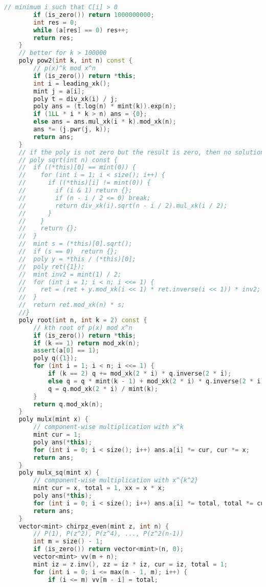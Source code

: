 \documentclass[10pt, a4paper, oneside]{book}
\begin{document}
\begin{lstlisting}[language=C++]
        // minimum i such that C[i] > 0
        if (is_zero()) return 1000000000;
        int res = 0;
        while (a[res] == 0) res++;
        return res;
    }
    // better for k > 100000
    poly pow2(int k, int n) const {
        // p(x)^k mod x^n
        if (is_zero()) return *this;
        int i = leading_xk();
        mint j = a[i];
        poly t = div_xk(i) / j;
        poly ans = (t.log(n) * mint(k)).exp(n);
        if (1LL * i * k > n) ans = {0};
        else ans = ans.mul_xk(i * k).mod_xk(n);
        ans *= (j.pwr(j, k));
        return ans;
    }
    // if the poly is not zero but the result is zero, then no solution
    // poly sqrt(int n) const {
    //  if ((*this)[0] == mint(0)) {
    //    for (int i = 1; i < size(); i++) {
    //      if ((*this)[i] != mint(0)) {
    //        if (i & 1) return {};
    //        if (n - i / 2 <= 0) break;
    //        return div_xk(i).sqrt(n - i / 2).mul_xk(i / 2);
    //      }
    //    }
    //    return {};
    //  }
    //  mint s = (*this)[0].sqrt();
    //  if (s == 0)  return {};
    //  poly y = *this / (*this)[0];
    //  poly ret({1});
    //  mint inv2 = mint(1) / 2;
    //  for (int i = 1; i < n; i <<= 1) {
    //    ret = (ret + y.mod_xk(i << 1) * ret.inverse(i << 1)) * inv2;
    //  }
    //  return ret.mod_xk(n) * s;
    //}
    poly root(int n, int k = 2) const {
        // kth root of p(x) mod x^n
        if (is_zero()) return *this;
        if (k == 1) return mod_xk(n);
        assert(a[0] == 1);
        poly q({1});
        for (int i = 1; i < n; i <<= 1) {
            if (k == 2) q += mod_xk(2 * i) * q.inverse(2 * i);
            else q = q * mint(k - 1) + mod_xk(2 * i) * q.inverse(2 * i).pow(k - 1, 2 * i);
            q = q.mod_xk(2 * i) / mint(k);
        }
        return q.mod_xk(n);
    }
    poly mulx(mint x) {
        // component-wise multiplication with x^k
        mint cur = 1;
        poly ans(*this);
        for (int i = 0; i < size(); i++) ans.a[i] *= cur, cur *= x;
        return ans;
    }
    poly mulx_sq(mint x) {
        // component-wise multiplication with x^{k^2}
        mint cur = x, total = 1, xx = x * x;
        poly ans(*this);
        for (int i = 0; i < size(); i++) ans.a[i] *= total, total *= cur, cur *= xx;
        return ans;
    }
    vector<mint> chirpz_even(mint z, int n) {
        // P(1), P(z^2), P(z^4), ..., P(z^2(n-1))
        int m = size() - 1;
        if (is_zero()) return vector<mint>(n, 0);
        vector<mint> vv(m + n);
        mint iz = z.inv(), zz = iz * iz, cur = iz, total = 1;
        for (int i = 0; i <= max(n - 1, m); i++) {
            if (i <= m) vv[m - i] = total;

\end{lstlisting}
\end{document}
